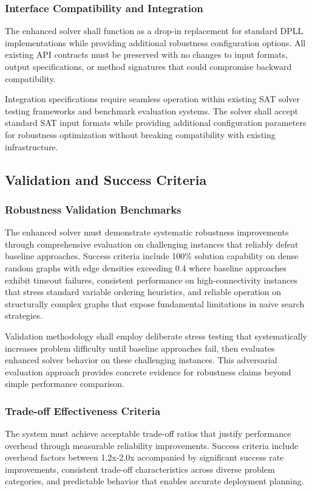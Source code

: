 \subsubsection{Interface Compatibility and Integration}
The enhanced solver shall function as a drop-in replacement for standard DPLL implementations while providing additional robustness configuration options. All existing API contracts must be preserved with no changes to input formats, output specifications, or method signatures that could compromise backward compatibility.

Integration specifications require seamless operation within existing SAT solver testing frameworks and benchmark evaluation systems. The solver shall accept standard SAT input formats while providing additional configuration parameters for robustness optimization without breaking compatibility with existing infrastructure.

\subsection{Validation and Success Criteria}

\subsubsection{Robustness Validation Benchmarks}
The enhanced solver must demonstrate systematic robustness improvements through comprehensive evaluation on challenging instances that reliably defeat baseline approaches. Success criteria include 100\% solution capability on dense random graphs with edge densities exceeding 0.4 where baseline approaches exhibit timeout failures, consistent performance on high-connectivity instances that stress standard variable ordering heuristics, and reliable operation on structurally complex graphs that expose fundamental limitations in naive search strategies.

Validation methodology shall employ deliberate stress testing that systematically increases problem difficulty until baseline approaches fail, then evaluates enhanced solver behavior on these challenging instances. This adversarial evaluation approach provides concrete evidence for robustness claims beyond simple performance comparison.

\subsubsection{Trade-off Effectiveness Criteria}
The system must achieve acceptable trade-off ratios that justify performance overhead through measurable reliability improvements. Success criteria include overhead factors between 1.2x-2.0x accompanied by significant success rate improvements, consistent trade-off characteristics across diverse problem categories, and predictable behavior that enables accurate deployment planning.

